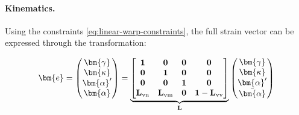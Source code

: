
\paragraph{Kinematics.}
Using the constraints \eqref{eq:linear-warp-constraints}, the full strain vector can be expressed through the transformation:

\begin{equation}
\bm{e}=\begin{pmatrix}
\bm{\gamma} \\ \bm{\kappa} \\ \bm{\alpha}' \\\bm{\alpha}
\end{pmatrix}=\underbrace{\begin{bmatrix}
\mathbf{1} & \mathbf{0} & \mathbf{0} & \mathbf{0} \\ 
\mathbf{0} & \mathbf{1} & \mathbf{0} & \mathbf{0} \\ 
\mathbf{0} & \mathbf{0} & \mathbf{1} & \mathbf{0} \\
\mathbf{L}_{\rm vn} & \mathbf{L}_{\rm vm} & \mathbf{0} & \mathbf{1}-\mathbf{L}_{\rm vv}
\end{bmatrix}}_{\mathbf{L}}
\begin{pmatrix}
\bm{\gamma} \\ \bm{\kappa} \\ \bm{\alpha}' \\ \bar{\bm{\alpha}}
\end{pmatrix}
\label{eq:warping-projection}
\end{equation}
